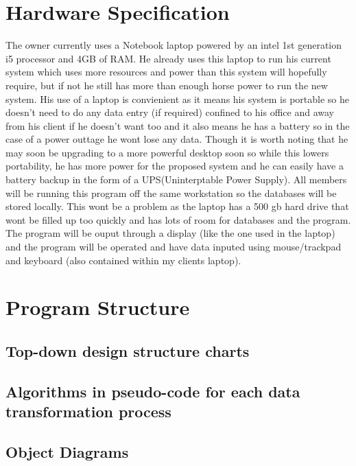 \section{Hardware Specification}

The owner currently uses a Notebook laptop powered by an intel 1st generation
i5 processor and 4GB of RAM. He already uses this laptop to run his current
system which uses more resources and power than this system will hopefully
require, but if not he still has more than enough horse power to run the new
system. His use of a laptop is convienient as it means his system is portable
so he doesn’t need to do any data entry (if required) confined to his office and
away from his client if he doesn’t want too and it also means he has a battery so
in the case of a power outtage he wont lose any data. Though it is worth noting
that he may soon be upgrading to a more powerful desktop soon so while this
lowers portability, he has more power for the proposed system and he can easily
have a battery backup in the form of a UPS(Uninterptable Power Supply).
All members will be running this program off the same workstation so the
databases will be stored locally. This wont be a problem as the laptop has a 500 gb hard drive that wont be filled up too quickly and has lots of room for databases and the program. The program will be ouput through a display (like the one used in the laptop) and the program will be operated and have data inputed using mouse/trackpad and keyboard (also contained within my clients laptop). 



\section{Program Structure}

\subsection{Top-down design structure charts}

\subsection{Algorithms in pseudo-code for each data transformation process}

\subsection{Object Diagrams}

